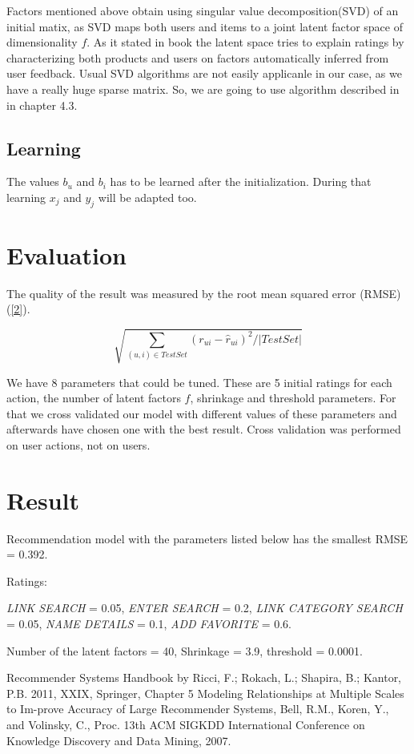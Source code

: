 \documentclass[pdftex,a4paper,11pt]{article}
\begin{document}
Factors mentioned above obtain using singular value decomposition(SVD) of an initial matix, as SVD maps both users and items to a joint latent factor space of dimensionality $ f $. As it stated in book \cite{1} the latent space tries to explain ratings by characterizing both products and users on factors automatically inferred from user feedback. Usual SVD algorithms are not easily applicanle in our case, as we have a really huge sparse matrix. So, we are going to use algorithm described in \cite{2} in chapter 4.3. 

\subsection{Learning}

The values $b_u$ and $b_i$ has to be learned after the initialization. During that learning $x_j$ and $y_j$ will be adapted too.



\section{Evaluation}

The quality of the result was measured by the root mean squared error (RMSE) (\ref{2}).
 
\begin{equation} \label{2} \sqrt{ \sum_{(u,i) \in TestSet} (r_{u i} - \hat{r}_{u i} ) ^2 / \left| TestSet \right| } \end{equation}

We have 8 parameters that could be tuned. These are 5 initial ratings for each action,  the number of latent factors $ f $, shrinkage and threshold parameters. For that we cross validated our model with different values of these parameters and afterwards have chosen one with the best result. Cross validation was performed on user actions, not on users.

\section{Result}
Recommendation model with the parameters listed below has the smallest RMSE = 0.392.

Ratings:

\textit{LINK SEARCH} = 0.05, \textit{ENTER SEARCH} = 0.2, \textit{LINK CATEGORY SEARCH} = 0.05, \textit{NAME DETAILS} = 0.1, \textit{ADD FAVORITE} = 0.6.

Number of the latent factors = 40, Shrinkage = 3.9, threshold = 0.0001.



\begin{thebibliography}{99}
 Recommender Systems Handbook by Ricci, F.; Rokach, L.; Shapira, B.; Kantor, P.B. 2011, XXIX, Springer,  Chapter 5
  Modeling Relationships at Multiple Scales to Im-prove Accuracy of Large Recommender Systems, Bell, R.M., Koren, Y., and Volinsky, C., Proc. 13th ACM SIGKDD International
Conference on Knowledge Discovery and Data Mining, 2007.
\end{thebibliography}
\nocite{*}


\end{document}
